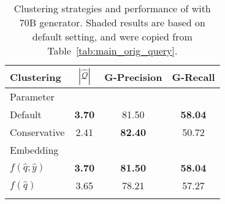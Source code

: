 \begin{table}[t]
    \centering
    \fontsize{10pt}{12pt}\selectfont
    \begin{tabular}{lccc}
        \thickhline
        Clustering & $|\hat{\mathcal{Q}}|$ & G-Precision & G-Recall \\ \hline
        \multicolumn{4}{l}{Parameter} \\
        \rowcolor{gray!10}
        \phantom{0} Default & \bf 3.70 & 81.50 & \bf 58.04 \\
        \phantom{0} Conservative & 2.41 & \bf 82.40 & 50.72 \\ \hline
        \multicolumn{4}{l}{Embedding} \\
        \rowcolor{gray!10}
        \phantom{0} $f(\hat{q};\hat{y})$ & \bf 3.70 & \bf 81.50 & \bf 58.04 \\
        \phantom{0}  $f(\hat{q})$ & 3.65 & 78.21 & 57.27 \\
        \thickhline
    \end{tabular}

    \caption{Clustering strategies and performance of \ours with 70B generator. Shaded results are based on default setting, and were copied from Table~\ref{tab:main_orig_query}.
    }
    \label{tab:cluster_strats}
\end{table}

